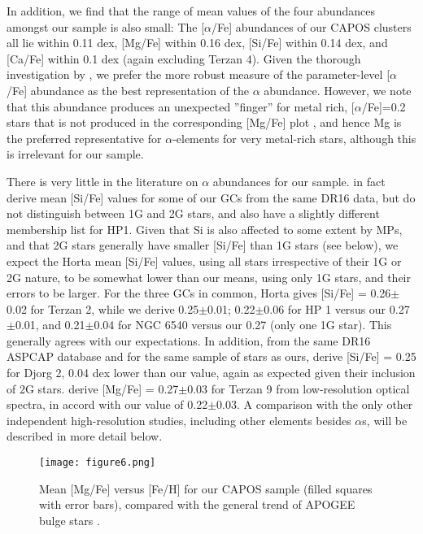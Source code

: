 \documentclass[onecolumn]{aa}
\begin{document}
In addition, we find that the range of mean values of the four abundances amongst our sample is also small: The  [$\alpha$/Fe] abundances of our CAPOS clusters all lie within 0.11 dex, [Mg/Fe] within 0.16 dex, [Si/Fe]  within 0.14 dex, and [Ca/Fe] within 0.1 dex (again excluding Terzan 4). Given the thorough investigation by \citet{Nidever2020}, we prefer the more robust measure of the 
parameter-level [$\alpha$/Fe] abundance as the best representation of the $\alpha$ abundance. However, we note that this abundance
produces an unexpected ”finger”  for metal rich, [$\alpha$/Fe]=0.2 stars that is not produced in the corresponding [Mg/Fe] plot \citep{Henrik2020}, and hence Mg is the preferred representative for $\alpha$-elements for very metal-rich stars, although this is irrelevant for our sample.

There is very little in the literature on $\alpha$ abundances for our sample. \citet{Horta2020} in fact derive mean [Si/Fe] values for some of our GCs from the same DR16 data, but do not distinguish between 1G and 2G stars, and also have a slightly different membership list for HP1. Given that Si is also affected to some extent by MPs, and that 2G stars generally have smaller [Si/Fe] than 1G stars (see below), we expect the Horta mean [Si/Fe] values, using all stars irrespective of their 1G or 2G nature, to be somewhat lower than our means, using only 1G stars, and their errors to be larger. For the three GCs in common, Horta gives [Si/Fe] = 0.26$\pm$0.02 for Terzan 2, while we derive 0.25$\pm$0.01; 0.22$\pm$0.06 for HP 1 versus our 0.27$\pm$0.01, and
0.21$\pm$0.04 for NGC 6540 versus our 0.27 (only one 1G star). This generally agrees with our expectations. 
In  addition, from the same DR16 ASPCAP database and for the same sample of stars as ours, \cite{Kunder2020} derive [Si/Fe] = 0.25 for Djorg 2, 0.04 dex lower than our value, again as expected given their inclusion of 2G stars.  
\citet{Ernandes2019} derive [Mg/Fe] = 0.27$\pm$0.03 for Terzan 9 from low-resolution optical spectra, in accord with our value of 0.22$\pm$0.03.
A comparison with the only other independent high-resolution studies, including other elements besides $\alpha$s,  will be described in more detail below.

\begin{figure*}
\centering
   \texttt{[image: figure6.png]}
      \caption{Mean [Mg/Fe] versus [Fe/H] for our CAPOS sample
       (filled squares with error bars), compared with the general trend of APOGEE bulge stars \citep[asterisks - ][]{Rojas-Arriagada2020}.
}
    \label{MgFe}
\end{figure*}
\end{document}
